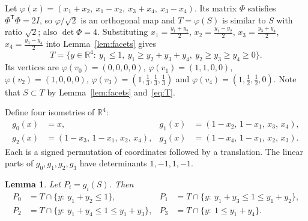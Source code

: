 \documentclass[11pt]{article}
\newtheorem{lemma}[theorem]{Lemma}
\theoremstyle{remark}
\begin{document}
Let $\varphi(x)=(x_1+x_2,\ x_1-x_2,\ x_3+x_4,\ x_3-x_4)$. Its matrix
$\Phi$ satisfies $\Phi^{\mathsf T}\Phi=2I$, so $\varphi/\sqrt2$ is an
orthogonal map and $T=\varphi(S)$ is similar to $S$ with ratio $\sqrt2$;
also $\det\Phi=4$. Substituting $x_1=\frac{y_1+y_2}2$,
$x_2=\frac{y_1-y_2}2$, $x_3=\frac{y_3+y_4}2$, $x_4=\frac{y_3-y_4}2$ into
Lemma~\ref{lem:facets} gives
\begin{equation}\label{eq:T}
T=\{y\in\mathbb{R}^4:\ y_1\le1,\ y_1\ge y_2+y_3+y_4,\ y_2\ge y_3\ge y_4\ge0\}.
\end{equation}
Its vertices are $\varphi(v_0)=(0,0,0,0)$, $\varphi(v_1)=(1,1,0,0)$,
$\varphi(v_2)=(1,0,0,0)$, $\varphi(v_3)=(1,\tfrac13,\tfrac13,\tfrac13)$
and $\varphi(v_4)=(1,\tfrac12,\tfrac12,0)$. Note that $S\subset T$ by
Lemma~\ref{lem:facets} and~\eqref{eq:T}.

Define four isometries of $\mathbb{R}^4$:
\begin{align*}
g_0(x)&=x, & g_1(x)&=(1-x_2,\,1-x_1,\,x_3,\,x_4),\\
g_2(x)&=(1-x_3,\,1-x_1,\,x_2,\,x_4), & g_3(x)&=(1-x_4,\,1-x_1,\,x_2,\,x_3).
\end{align*}
Each is a signed permutation of coordinates followed by a translation.
The linear parts of $g_0,g_1,g_2,g_3$ have determinants $1,-1,1,-1$.

\begin{lemma}\label{lem:pieces}
Let $P_i=g_i(S)$. Then
\begin{align*}
P_0&=T\cap\{y:\ y_1+y_2\le1\}, &
P_1&=T\cap\{y:\ y_1+y_3\le1\le y_1+y_2\},\\
P_2&=T\cap\{y:\ y_1+y_4\le1\le y_1+y_3\}, &
P_3&=T\cap\{y:\ 1\le y_1+y_4\}.
\end{align*}
\end{lemma}
\end{document}
